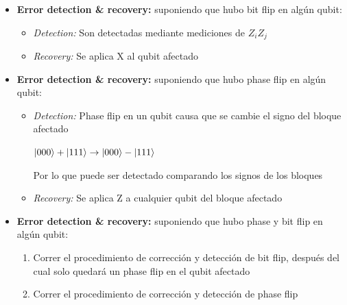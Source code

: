 \documentclass[10pt]{beamer}
\theoremstyle{remark}
\theoremstyle{definition}
\begin{document}
\begin{frame}[allowframebreaks]
    \framebreak

    \begin{itemize}
        \item \textbf{Error detection \& recovery:} suponiendo que hubo bit flip en algún qubit:
    
        \vspace{0.4cm}

        \begin{itemize}
            \item \textit{Detection:} Son detectadas mediante mediciones de $Z_iZ_j$
            \item \textit{Recovery:} Se aplica X al qubit afectado
        \end{itemize}
    \end{itemize}

    \framebreak

    \begin{itemize}
        \item \textbf{Error detection \& recovery:} suponiendo que hubo phase flip en algún qubit:
    
        \vspace{0.4cm}

        \begin{itemize}
            \item \textit{Detection:} Phase flip en un qubit causa que se cambie el signo del bloque afectado
            
            $\ket{000} + \ket{111} \rightarrow \ket{000} - \ket{111}$

            Por lo que puede ser detectado comparando los signos de los bloques %

            \item \textit{Recovery:} Se aplica Z a cualquier qubit del bloque afectado
        \end{itemize}
    \end{itemize}

    \framebreak

    \begin{itemize}
        \item \textbf{Error detection \& recovery:} suponiendo que hubo phase y bit flip en algún qubit:
    
        \vspace{0.4cm}

        \begin{enumerate}
            \item Correr el procedimiento de corrección y detección de bit flip, después del cual solo quedará un phase flip en el qubit afectado
            \item Correr el procedimiento de corrección y detección de phase flip
        \end{enumerate}
    \end{itemize}


\end{frame}
\end{document}
